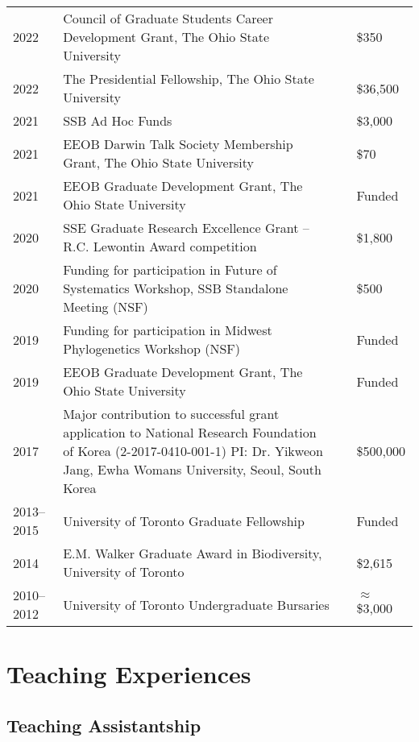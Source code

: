 \documentclass[11pt]{article}
\begin{document}
\begin{longtable}{p{}  p{} p{} p{} }%
2022 & 	Council of Graduate Students Career Development Grant, The Ohio State University & & \$350\\
2022 &	The Presidential Fellowship, The Ohio State University & & \$36,500\\
2021 &	SSB Ad Hoc Funds	& & \$3,000\\
2021 &	EEOB Darwin Talk Society Membership Grant, The Ohio State University	& & \$70\\
2021 &	EEOB Graduate Development Grant, The Ohio State University	& & Funded\\
2020 &	SSE Graduate Research Excellence Grant – R.C. Lewontin Award competition	& & \$1,800 \\
2020 &	Funding for participation in Future of Systematics Workshop, SSB Standalone Meeting (NSF)	& & \$500\\
2019 &	Funding for participation in Midwest Phylogenetics Workshop (NSF)	& & Funded\\
2019 &	EEOB Graduate Development Grant, The Ohio State University	& & Funded\\
2017 &	Major contribution to successful grant application to 	National Research Foundation of Korea (2-2017-0410-001-1) PI: Dr. Yikweon Jang, Ewha Womans University, Seoul, South Korea	& & \ddag\$500,000\\
2013--2015 & University of Toronto Graduate Fellowship	& & Funded\\
2014 &	E.M. Walker Graduate Award in Biodiversity, University of Toronto	& & \dag\$2,615 \\
2010--2012 &	University of Toronto Undergraduate Bursaries	& & \dag$\approx$\$3,000 \\

\end{longtable}


\hspace{0pt}



\section*{Teaching Experiences}

\subsection*{Teaching Assistantship}
\end{document}
